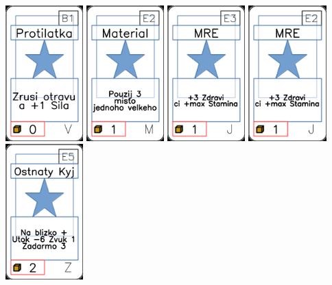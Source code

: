 \documentclass[a4paper]{article}
\begin{document}
	\includegraphics[width=3.0cm]{img-1_65}
	\includegraphics[width=3.0cm]{img-1_51}
	\includegraphics[width=3.0cm]{img-1_22}
	\includegraphics[width=3.0cm]{img-1_21}
	\includegraphics[width=3.0cm]{img-1_84}
\end{document}
